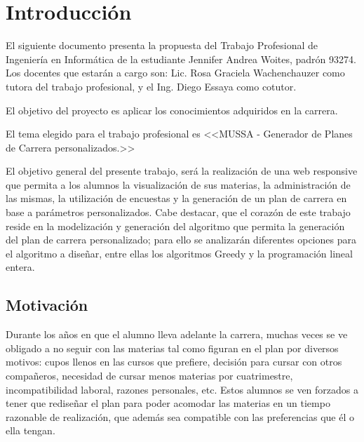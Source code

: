 \documentclass[a4paper]{article}
\begin{document}
  \newpage
  

  \tableofcontents %
    
  \pagestyle{fancy} %
  \rhead{}
  \renewcommand{\headrulewidth}{0.4pt} %

  \newpage


\section{Introducción}

El siguiente documento presenta la propuesta del Trabajo Profesional de Ingeniería en Informática de la estudiante Jennifer Andrea Woites, padrón 93274. Los docentes que estarán a cargo son: Lic. Rosa Graciela Wachenchauzer como tutora del trabajo profesional, y el Ing. Diego Essaya como cotutor. \newline

El objetivo del proyecto es aplicar los conocimientos adquiridos en la carrera. \newline

El tema elegido para el trabajo profesional es <<MUSSA - Generador de Planes de Carrera personalizados.>> \newline

El objetivo general del presente trabajo, será la realización de una web responsive que permita a los alumnos la visualización de sus materias, la administración de las mismas, la utilización de encuestas y la generación de un plan de carrera en base a parámetros personalizados. Cabe destacar, que el corazón de este trabajo reside en la modelización y generación del algoritmo que permita la generación del plan de carrera personalizado; para ello se analizarán diferentes opciones para el algoritmo a diseñar, entre ellas los algoritmos Greedy y la programación lineal entera.

\subsection{Motivación}

Durante los años en que el alumno lleva adelante la carrera, muchas veces se ve obligado a no seguir con las materias tal como figuran en el plan por diversos motivos: cupos llenos en las cursos que prefiere, decisión para cursar con otros compañeros, necesidad de cursar menos materias por cuatrimestre, incompatibilidad laboral, razones personales, etc. Estos alumnos se ven forzados a tener que rediseñar el plan para poder acomodar las materias en un tiempo razonable de realización, que además sea compatible con las preferencias que él o ella tengan.
\end{document}

